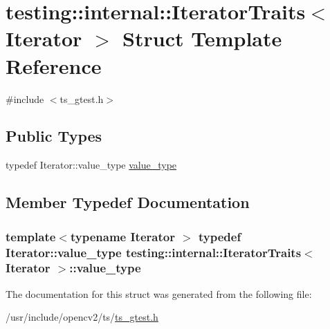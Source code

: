 \hypertarget{structtesting_1_1internal_1_1IteratorTraits}{\section{testing\-:\-:internal\-:\-:Iterator\-Traits$<$ Iterator $>$ Struct Template Reference}
\label{structtesting_1_1internal_1_1IteratorTraits}
}


{\ttfamily \#include $<$ts\-\_\-gtest.\-h$>$}

\subsection*{Public Types}
\begin{DoxyCompactItemize}
\item 
typedef Iterator\-::value\-\_\-type \hyperlink{structtesting_1_1internal_1_1IteratorTraits_a29de4320a9c53ce438d3561b94e515bb}{value\-\_\-type}
\end{DoxyCompactItemize}


\subsection{Member Typedef Documentation}
\hypertarget{structtesting_1_1internal_1_1IteratorTraits_a29de4320a9c53ce438d3561b94e515bb}{
\subsubsection[{value\-\_\-type}]{\setlength{\rightskip}{0pt plus 5cm}template$<$typename Iterator $>$ typedef Iterator\-::value\-\_\-type {\bf testing\-::internal\-::\-Iterator\-Traits}$<$ Iterator $>$\-::{\bf value\-\_\-type}}}\label{structtesting_1_1internal_1_1IteratorTraits_a29de4320a9c53ce438d3561b94e515bb}


The documentation for this struct was generated from the following file\-:\begin{DoxyCompactItemize}
\item 
/usr/include/opencv2/ts/\hyperlink{ts__gtest_8h}{ts\-\_\-gtest.\-h}\end{DoxyCompactItemize}
